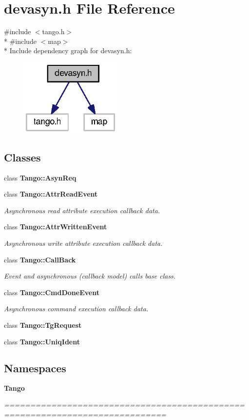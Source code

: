 \section{devasyn.\-h File Reference}
\label{devasyn_8h}
{\ttfamily \#include $<$tango.\-h$>$}\\*
{\ttfamily \#include $<$map$>$}\\*
Include dependency graph for devasyn.\-h\-:
\nopagebreak
\begin{figure}[H]
\begin{center}
\leavevmode
\includegraphics[width=145pt]{d3/d03/devasyn_8h__incl}
\end{center}
\end{figure}
\subsection*{Classes}
\begin{DoxyCompactItemize}
\item 
class {\bf Tango\-::\-Asyn\-Req}
\item 
class {\bf Tango\-::\-Attr\-Read\-Event}
\begin{DoxyCompactList}\small\item\em Asynchronous read attribute execution callback data. \end{DoxyCompactList}\item 
class {\bf Tango\-::\-Attr\-Written\-Event}
\begin{DoxyCompactList}\small\item\em Asynchronous write attribute execution callback data. \end{DoxyCompactList}\item 
class {\bf Tango\-::\-Call\-Back}
\begin{DoxyCompactList}\small\item\em Event and asynchronous (callback model) calls base class. \end{DoxyCompactList}\item 
class {\bf Tango\-::\-Cmd\-Done\-Event}
\begin{DoxyCompactList}\small\item\em Asynchronous command execution callback data. \end{DoxyCompactList}\item 
class {\bf Tango\-::\-Tg\-Request}
\item 
class {\bf Tango\-::\-Uniq\-Ident}
\end{DoxyCompactItemize}
\subsection*{Namespaces}
\begin{DoxyCompactItemize}
\item 
{\bf Tango}
\begin{DoxyCompactList}\small\item\em ============================================================================= \end{DoxyCompactList}\end{DoxyCompactItemize}
